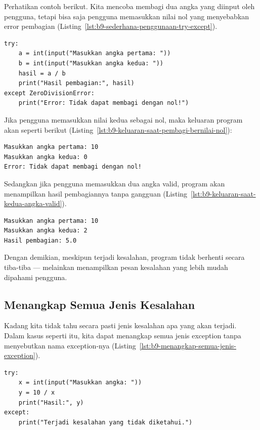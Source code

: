 Perhatikan contoh berikut. Kita mencoba membagi dua angka yang diinput oleh pengguna, tetapi bisa saja pengguna memasukkan nilai nol yang menyebabkan error pembagian (Listing~\ref{lst:b9-sederhana-penggunaan-try-except}).

\begin{lstlisting}[style=PythonStyle, caption={Contoh sederhana penggunaan try-except}, label={lst:b9-sederhana-penggunaan-try-except}]
try:
    a = int(input("Masukkan angka pertama: "))
    b = int(input("Masukkan angka kedua: "))
    hasil = a / b
    print("Hasil pembagian:", hasil)
except ZeroDivisionError:
    print("Error: Tidak dapat membagi dengan nol!")
\end{lstlisting}

Jika pengguna memasukkan nilai kedua sebagai nol, maka keluaran program akan seperti berikut (Listing~\ref{lst:b9-keluaran-saat-pembagi-bernilai-nol}):

\begin{lstlisting}[language=bash, caption={Keluaran saat pembagi bernilai nol}, label={lst:b9-keluaran-saat-pembagi-bernilai-nol}]
Masukkan angka pertama: 10
Masukkan angka kedua: 0
Error: Tidak dapat membagi dengan nol!
\end{lstlisting}

Sedangkan jika pengguna memasukkan dua angka valid, program akan menampilkan hasil pembagiannya tanpa gangguan (Listing~\ref{lst:b9-keluaran-saat-kedua-angka-valid}).

\begin{lstlisting}[language=bash, caption={Keluaran saat kedua angka valid}, label={lst:b9-keluaran-saat-kedua-angka-valid}]
Masukkan angka pertama: 10
Masukkan angka kedua: 2
Hasil pembagian: 5.0
\end{lstlisting}

Dengan demikian, meskipun terjadi kesalahan, program tidak berhenti secara tiba-tiba — melainkan menampilkan pesan kesalahan yang lebih mudah dipahami pengguna.

\subsection*{Menangkap Semua Jenis Kesalahan}

Kadang kita tidak tahu secara pasti jenis kesalahan apa yang akan terjadi. Dalam kasus seperti itu, kita dapat menangkap semua jenis exception tanpa menyebutkan nama exception-nya (Listing~\ref{lst:b9-menangkap-semua-jenis-exception}).

\begin{lstlisting}[style=PythonStyle, caption={Menangkap semua jenis exception}, label={lst:b9-menangkap-semua-jenis-exception}]
try:
    x = int(input("Masukkan angka: "))
    y = 10 / x
    print("Hasil:", y)
except:
    print("Terjadi kesalahan yang tidak diketahui.")
\end{lstlisting}

